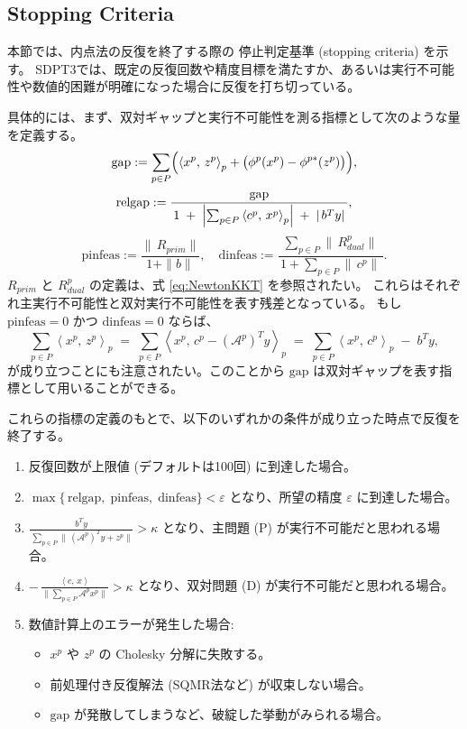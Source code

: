 \documentclass{jsarticle}
\newcommand{\inprod}[2]{\left\langle #1, \, #2 \right\rangle}
\begin{document}
\medskip
\subsection{Stopping Criteria}
\label{sec:stopping_criteria}

本節では、内点法の反復を終了する際の 停止判定基準 (stopping criteria) を示す。
SDPT3では、既定の反復回数や精度目標を満たすか、あるいは実行不可能性や数値的困難が明確になった場合に反復を打ち切っている。

具体的には、まず、双対ギャップと実行不可能性を測る指標として次のような量を定義する。
\[
  \mathrm{gap}
  := \sum_{p\in P}
       \Bigl(\inprod{x^p}{z^p}_p + \bigl(\phi^p(x^p) - \phi^{p*}(z^p)\bigr)\Bigr),
\]
\[
  \mathrm{relgap}
  := \frac{\mathrm{gap}}
           {\,1 \;+\;\Bigl|\sum_{p\in P}\inprod{c^p}{x^p}_p\Bigr|
                 \;+\;|\,b^T y|\,},
\]
\[
  \mathrm{pinfeas}
  := \frac{\|\,R_{prim}\|}{\,1 + \|b\|\,},
  \quad
  \mathrm{dinfeas}
  := \frac{\sum_{p\in P}\|\,R^p_{dual}\|}
           {\,1 + \sum_{p\in P}\|\,c^p\|\,}.
\]
$R_{prim}$ と $R_{dual}^p$ の定義は、式 \eqref{eq:NewtonKKT} を参照されたい。
これらはそれぞれ主実行不可能性と双対実行不可能性を表す残差となっている。
もし $\mathrm{pinfeas} = 0$ かつ $\mathrm{dinfeas} = 0$ ならば、
\[
  \sum_{p\in P}\inprod{x^p}{z^p}_p 
  \;=\;
  \sum_{p\in P}\inprod{x^p}{c^p - (\mathcal{A}^p)^T y}_p
  \;=\; \sum_{p\in P}\inprod{x^p}{c^p}_p \;-\; b^T y,
\]
が成り立つことにも注意されたい。このことから $\mathrm{gap}$ は双対ギャップを表す指標として用いることができる。

これらの指標の定義のもとで、以下のいずれかの条件が成り立った時点で反復を終了する。

\begin{enumerate}
    \item 反復回数が上限値 (デフォルトは100回) に到達した場合。
    \item 
      $\displaystyle
      \max\{\,\mathrm{relgap},\;\mathrm{pinfeas},\;\mathrm{dinfeas}\}
      < \varepsilon
      $
      となり、所望の精度 $\varepsilon$ に到達した場合。
    \item 
      $\displaystyle
        \frac{\,b^T y\,}
              {\,\sum_{p\in P}\|\,(\mathcal{A}^p)^T y + z^p\|\!}
      > \kappa
      $
      となり、主問題 (P) が実行不可能だと思われる場合。
    \item 
      $\displaystyle
      -\,\frac{\inprod{c}{x}}
              {\bigl\|\sum_{p\in P}\mathcal{A}^p x^p\bigr\|}
      > \kappa
      $
      となり、双対問題 (D) が実行不可能だと思われる場合。
    \item 数値計算上のエラーが発生した場合:
      \begin{itemize}
          \item $x^p$ や $z^p$ の Cholesky 分解に失敗する。
          \item 前処理付き反復解法 (SQMR法など) が収束しない場合。
          \item $\mathrm{gap}$ が発散してしまうなど、破綻した挙動がみられる場合。
      \end{itemize}
\end{enumerate}
\end{document}
